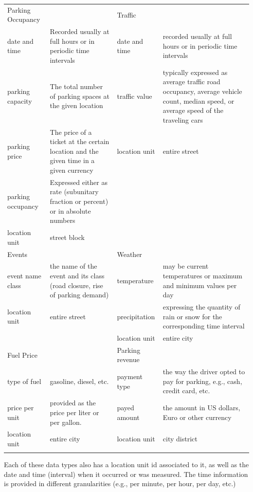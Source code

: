 \documentclass{ws-ijait}
\begin{document}
	\begin{table}
		{\begin{tabular}{lp{4cm}lp{4cm}}	
				\toprule
				Parking Occupancy & & Traffic & \\
				\colrule
				date and time & Recorded usually at full hours or in periodic time intervals & date and time & recorded usually at full hours or in periodic time intervals \\
				parking capacity & The total number of parking spaces at the given location & traffic value & typically expressed as average traffic road occupancy, average vehicle count, median speed, or average speed of the traveling cars \\
				parking price & The price of a ticket at the certain location and the given time in a given currency & location unit & entire street \\
				parking occupancy & Expressed either as rate (subunitary fraction or percent) or in absolute numbers & & \\
				location unit & street block & & \\
				\colrule
				Events & & Weather & \\
				\colrule
				event name class & the name of the event and its class (road closure, rise of parking demand) & temperature & may be current temperatures or maximum and minimum values per day \\
				location unit & entire street & precipitation & expressing the quantity of rain or snow for the corresponding time interval \\
				& & location unit & entire city \\
				\colrule
				Fuel Price & & Parking revenue & \\
				\colrule
				type of fuel & gasoline, diesel, etc. & payment type & the way the driver opted to pay for parking, e.g., cash, credit card, etc. \\
				
				price per unit & provided as the price per liter or per gallon. & payed amount & the amount in US dollars, Euro or other currency \\
				location unit & entire city & location unit & city district \\
				
				\botrule
		\end{tabular}}
		\begin{tabnote}
			Each of these data types also has a location unit id associated to it, as well as the date and time (interval) when it occurred or was measured. The time information is provided in different granularities (e.g., per minute, per hour, per day, etc.)
		\end{tabnote}
		\label{tab:sfpark_data}
	\end{table}
		
\end{document}
